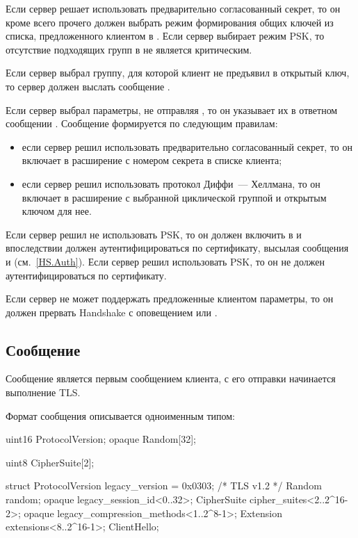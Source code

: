 Если сервер решает использовать предварительно согласованный секрет, то он 
кроме всего прочего должен выбрать режим формирования общих ключей из 
списка, предложенного клиентом в . 
Если сервер выбирает режим PSK, то отсутствие подходящих групп в 
 не является критическим.

Если сервер выбрал группу, для которой клиент не предъявил в 
 открытый ключ, то сервер должен выслать сообщение 
.

Если сервер выбрал параметры, не отправляя , 
то он указывает их в ответном сообщении .
%
Сообщение формируется по следующим правилам:

\begin{itemize}
\item
если сервер решил использовать предварительно согласованный секрет, то он 
включает в  расширение 
 с номером секрета в  
списке клиента;

\item
если сервер решил использовать протокол Диффи~--- Хеллмана, то он включает в 
 расширение 
с выбранной циклической группой и открытым ключом для нее. 
\end{itemize}

Если сервер решил не использовать PSK, то он должен включить 
 в 
и впоследствии должен аутентифицироваться по сертификату, высылая 
сообщения  и  
(см.~\ref{HS.Auth}).
%
Если сервер решил использовать PSK, то он не должен аутентифицироваться 
по сертификату.

Если сервер не может поддержать предложенные клиентом параметры, то он должен 
прервать Handshake с оповещением  или 
. 

\subsection{Сообщение }\label{HS.CH} 

Сообщение  является первым сообщением клиента,
с его отправки начинается выполнение TLS.

Формат сообщения  описывается одноименным типом:
%
\begin{codeblock}
uint16 ProtocolVersion;
opaque Random[32];

uint8 CipherSuite[2];

struct {
  ProtocolVersion legacy_version = 0x0303;  /* TLS v1.2 */
  Random random;
  opaque legacy_session_id<0..32>;
  CipherSuite cipher_suites<2..2^16-2>;
  opaque legacy_compression_methods<1..2^8-1>;
  Extension extensions<8..2^16-1>;
} ClientHello;
\end{codeblock}


